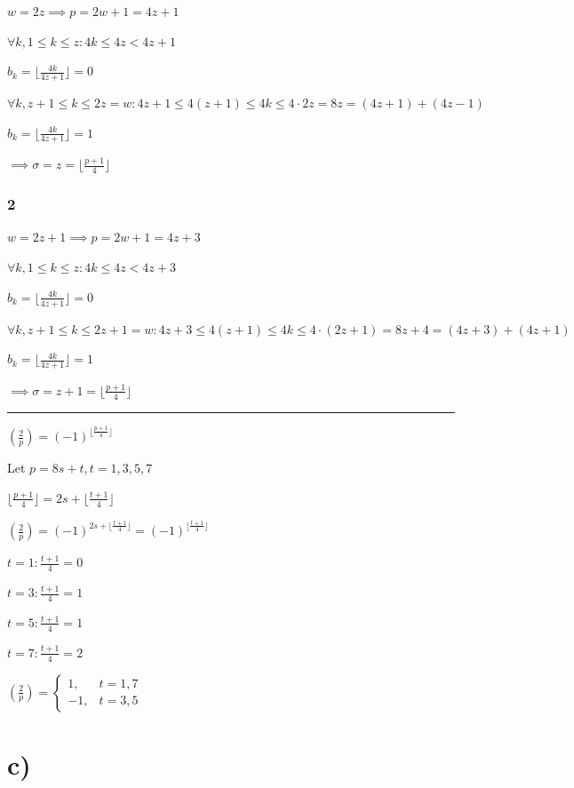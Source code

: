 \documentclass{article}
\begin{document}
$w = 2z \implies p = 2w + 1 = 4z + 1$

$\forall k, 1 \leq k \leq z:  4k \leq 4z < 4z + 1$

$b_k = \lfloor{\frac{4k}{4z+1}}\rfloor = 0$

$\forall k, z+1 \leq k \leq 2z = w: 4z + 1 \leq 4(z + 1) \leq 4k \leq 4\cdot2z = 8z = (4z + 1) + (4z-1)$

$b_k = \lfloor{\frac{4k}{4z+1}}\rfloor = 1$

$\implies \sigma = z = \lfloor{\frac{p+1}{4}}\rfloor$

\subsubsection*{2}

$w = 2z+1 \implies p = 2w + 1 = 4z + 3$

$\forall k, 1 \leq k \leq z:  4k \leq 4z < 4z + 3$

$b_k = \lfloor{\frac{4k}{4z+1}}\rfloor = 0$

$\forall k, z+1 \leq k \leq 2z + 1 = w: 4z + 3 \leq 4(z + 1) \leq 4k \leq 4\cdot(2z + 1) = 8z + 4 = (4z + 3) + (4z+1)$

$b_k = \lfloor{\frac{4k}{4z+1}}\rfloor = 1$

$\implies \sigma = z + 1 = \lfloor{\frac{p+1}{4}}\rfloor$

\bigskip\hrule\bigskip

$(\frac{2}{p}) = (-1)^{\lfloor{\frac{p+1}{4}}\rfloor}$

Let $p = 8s + t, t = 1,3,5,7$

$\lfloor \frac{p+1}{4}\rfloor = 2s + \lfloor{\frac{t+1}{4}} \rfloor$

$(\frac{2}{p}) = (-1)^{2s + \lfloor{\frac{t+1}{4}} \rfloor} = (-1)^{\lfloor{\frac{t+1}{4}} \rfloor}$

$t = 1: \frac{t+1}{4} = 0$

$t = 3: \frac{t+1}{4} = 1$

$t = 5: \frac{t+1}{4} = 1$

$t = 7: \frac{t+1}{4} = 2$

$(\frac{2}{p})= \left\{\begin{matrix}1, & t=1,7\\-1, &t=3,5\end{matrix}\right.$

\section*{c)}
\end{document}
